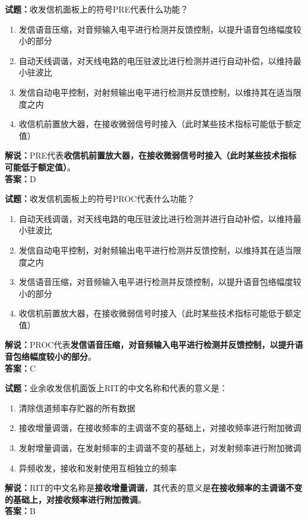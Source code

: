 \documentclass{ctexbook}
\begin{document}
\bigskip


\noindent\textbf{试题：}收发信机面板上的符号PRE代表什么功能？
\begin{enumerate}[leftmargin=3em]
\item 发信语音压缩，对音频输入电平进行检测并反馈控制，以提升语音包络幅度较小的部分
\item 自动天线调谐，对天线电路的电压驻波比进行检测并进行自动补偿，以维持最小驻波比
\item 发信自动电平控制，对射频输出电平进行检测并反馈控制，以维持其在适当限度之内
\item 收信机前置放大器，在接收微弱信号时接入（此时某些技术指标可能低于额定值）
\end{enumerate}
\noindent\textbf{解说：}PRE代表\textbf{收信机前置放大器，在接收微弱信号时接入（此时某些技术指标可能低于额定值）}。\\\noindent\textbf{答案：}D


\bigskip


\noindent\textbf{试题：}收发信机面板上的符号PROC代表什么功能？
\begin{enumerate}[leftmargin=3em]
\item 自动天线调谐，对天线电路的电压驻波比进行检测并进行自动补偿，以维持最小驻波比
\item 发信自动电平控制，对射频输出电平进行检测并反馈控制，以维持其在适当限度之内
\item 发信语音压缩，对音频输入电平进行检测并反馈控制，以提升语音包络幅度较小的部分
\item 收信机前置放大器，在接收微弱信号时接入（此时某些技术指标可能低于额定值）
\end{enumerate}
\noindent\textbf{解说：}PROC代表\textbf{发信语音压缩，对音频输入电平进行检测并反馈控制，以提升语音包络幅度较小的部分}。\\\noindent\textbf{答案：}C



\bigskip


\noindent\textbf{试题：}业余收发信机面饭上RIT的中文名称和代表的意义是：
\begin{enumerate}[leftmargin=3em]
\item 清除信道频率存贮器的所有数据
\item 接收增量调谐，在接收频率的主调谐不变的基础上，对接收频率进行附加微调
\item 发射增量调谐，在发射频率的主调谐不变的基础上，对发射频率进行附加微调
\item 异频收发，接收和发射使用互相独立的频率
\end{enumerate}
\noindent\textbf{解说：}RIT的中文名称是\textbf{接收增量调谐}，其代表的意义是\textbf{在接收频率的主调谐不变的基础上，对接收频率进行附加微调}。\\\noindent\textbf{答案：}B
\end{document}

